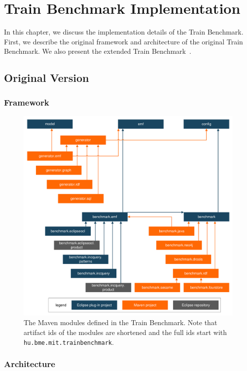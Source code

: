\chapter{Train Benchmark Implementation}

In this chapter, we discuss the implementation details of the Train Benchmark. First, we describe the original framework and architecture of the original Train Benchmark. We also present the extended Train Benchmark~\cite{SCP2014}.

\section{Original Version}

\subsection{Framework}

\begin{figure}[!Htb]
	\centering
	\includegraphics[width=\textwidth]{figures/trainbenchmark-modules}
	\caption{The Maven modules defined in the Train Benchmark. Note that artifact ids of the modules are shortened and the full ids start with \texttt{hu.bme.mit.trainbenchmark}.}
	\label{fig:trainbenchmark-modules}
\end{figure}

\subsection{Architecture}

